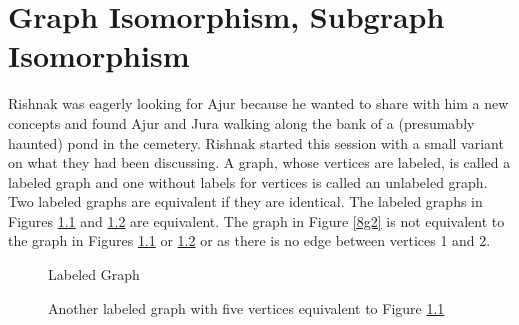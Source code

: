 \chapter{Graph Isomorphism, Subgraph Isomorphism}

Rishnak was eagerly looking for Ajur because he wanted to share with him a new concepts and found Ajur and Jura walking along the bank of a (presumably haunted) pond in the cemetery. Rishnak started this session with a small variant on what they had been discussing. A graph, whose vertices are labeled, is called a labeled graph and one without labels for vertices is called an unlabeled graph. Two labeled graphs are equivalent if they are identical. The labeled graphs in Figures \ref{8g1} and \ref{8g11} are equivalent. The graph in Figure \ref{8g2} is not equivalent to the graph in Figures \ref{8g1} or \ref{8g11} or as there is no edge between vertices 1 and 2.
\begin{figure}
\begin{center}
\caption{Labeled Graph}\label{8g1}
\end{center}

\end{figure}
\begin{figure}
\begin{center}
\caption{ Another labeled graph with five vertices equivalent to Figure \ref{8g1}}\label{8g11}
\end{center}
\end{figure}

